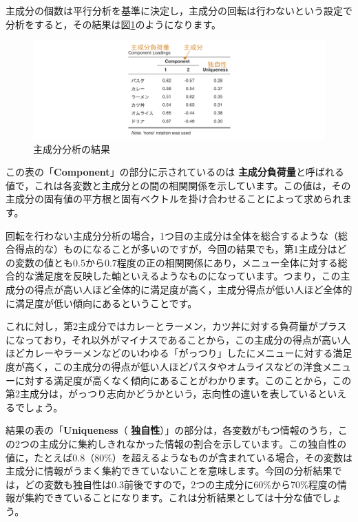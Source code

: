 \documentclass[
  12pt,
  a5jpaper,
  lualatex, ja=standard]{bxjsbook}
\renewcommand{\emph}[1]{\textbf{\color{emph} #1}}
\begin{document}
主成分の個数は平行分析を基準に決定し，主成分の回転は行わないという設定で分析をすると，その結果は図\ref{fig:factor-pca-results}のようになります。

\begin{figure}[!ht]

{\centering \includegraphics[width=1\linewidth]{images/factor/pca-results} 

}

\caption{主成分分析の結果}\label{fig:factor-pca-results}
\end{figure}

この表の「\textbf{Component}」の部分に示されているのは\emph{主成分負荷量}と呼ばれる値で，これは各変数と主成分との間の相関関係を示しています。この値は，その主成分の固有値の平方根と固有ベクトルを掛け合わせることによって求められます。

回転を行わない主成分分析の場合，1つ目の主成分は全体を総合するような（総合得点的な）ものになることが多いのですが，今回の結果でも，第1主成分はどの変数の値とも0.5から0.7程度の正の相関関係にあり，メニュー全体に対する総合的な満足度を反映した軸といえるようなものになっています。つまり，この主成分の得点が高い人ほど全体的に満足度が高く，主成分得点が低い人ほど全体的に満足度が低い傾向にあるということです。

これに対し，第2主成分ではカレーとラーメン，カツ丼に対する負荷量がプラスになっており，それ以外がマイナスであることから，この主成分の得点が高い人ほどカレーやラーメンなどのいわゆる「がっつり」したにメニューに対する満足度が高く，この主成分の得点が低い人ほどパスタやオムライスなどの洋食メニューに対する満足度が高くなく傾向にあることがわかります。このことから，この第2主成分は，がっつり志向かどうかという，志向性の違いを表しているといえるでしょう。

結果の表の「\textbf{Uniqueness}（\emph{独自性}）」の部分は，各変数がもつ情報のうち，この2つの主成分に集約しきれなかった情報の割合を示しています。この独自性の値に，たとえば0.8（80\%）を超えるようなものが含まれている場合，その変数は主成分に情報がうまく集約できていないことを意味します。今回の分析結果では，どの変数も独自性は0.3前後ですので，2つの主成分に60\%から70\%程度の情報が集約できていることになります。これは分析結果としては十分な値でしょう。
\end{document}
